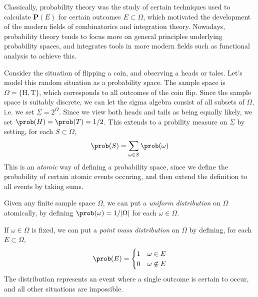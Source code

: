 Classically, probability theory was the study of certain techniques used to calculate $\mathbf{P}(E)$ for certain outcomes $E \subset \Omega$, which motivated the development of the modern fields of combinatorics and integration theory. Nowadays, probability theory tends to focus more on general principles underlying probability spaces, and integrates tools in more modern fields such as functional analysis to achieve this.

\begin{example}
    Consider the situation of flipping a coin, and observing a heads or tales. Let's model this random situation as a probability space. The sample space is $\Omega = \{ \text{H}, \text{T} \}$, which corresponds to all outcomes of the coin flip. Since the sample space is suitably discrete, we can let the sigma algebra consist of all subsets of $\Omega$, i.e. we set $\Sigma = 2^\Omega$. Since we view both heads and tails as being equally likely, we set $\prob(H) = \prob(T) = 1/2$. This extends to a probility measure on $\Sigma$ by setting, for each $S \subset \Omega$,
    \[ \prob(S) = \sum_{\omega \in S} \prob(\omega) \]
    This is an {\it atomic} way of defining a probability space, since we define the probability of certain atomic events occuring, and then extend the definition to all events by taking sums.
\end{example}

\begin{example}
    Given any finite sample space $\Omega$, we can put a \emph{uniform distribution} on $\Omega$ atomically, by defining $\prob(\omega) = 1/|\Omega|$ for each $\omega \in \Omega$.
\end{example}

\begin{example}
    If $\omega \in \Omega$ is fixed, we can put a \emph{point mass distribution} on $\Omega$ by defining, for each $E \subset \Omega$,
    \[ \prob(E) = \begin{cases} 1 & \omega \in E \\ 0 & \omega \not \in E \end{cases} \]
    The distribution represents an event where a single outcome is certain to occur, and all other situations are impossible.
\end{example}

